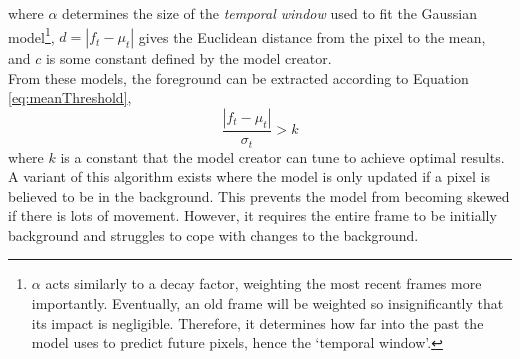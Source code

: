 where $\alpha$ determines the size of the \textit{temporal window} used to fit the Gaussian model\footnote{$\alpha$ acts similarly to a decay factor, weighting the most recent frames more importantly. Eventually, an old frame will be weighted so insignificantly that its impact is negligible. Therefore, it determines how far into the past the model uses to predict future pixels, hence the `temporal window'.}, $d = |f_t - \mu_t|$ gives the Euclidean distance from the pixel to the mean, and $c$ is some constant defined by the model creator.
\smallskip \\ \indent
From these models, the foreground can be extracted according to Equation \ref{eq:meanThreshold},
\begin{equation}
    \label{eq:meanThreshold}
    \frac{|f_t - \mu_t|}{\sigma_t} > k
\end{equation}
where $k$ is a constant that the model creator can tune to achieve optimal results.
\smallskip \\ \indent
A variant of this algorithm exists where the model is only updated if a pixel is believed to be in the background. This prevents the model from becoming skewed if there is lots of movement. However, it requires the entire frame to be initially background and struggles to cope with changes to the background.

\setlength{\leftskip}{0cm}
